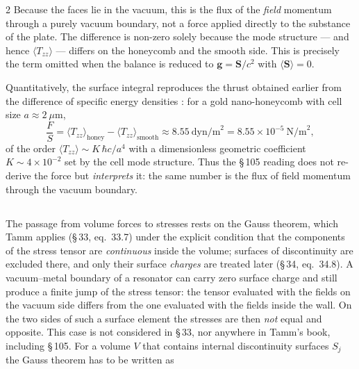 \documentclass[twoside, 10pt]{article}
\def\myvspacebeforesubsection{-2.0mm}
\def\myvspaceaftersubsection{-2.5mm}
\begin{document}
\begin{multicols}{2}
Because the faces lie in the vacuum, this is the flux of the \emph{field}
momentum through a purely vacuum boundary, not a force applied directly to the
substance of the plate. The difference is non-zero solely because the mode
structure --- and hence $\langle T_{zz}\rangle$ --- differs on the honeycomb and
the smooth side. This is precisely the term omitted when the balance is reduced
to $\mathbf{g}=\mathbf{S}/c^2$ with $\langle\mathbf{S}\rangle=0$.

Quantitatively, the surface integral reproduces the thrust obtained earlier from
the difference of specific energy densities \cite{Drozdov2024}: for a gold
nano-honeycomb with cell size $a\approx 2~\mu$m,
\[
\frac{F}{S} = \langle T_{zz}\rangle_{\mathrm{honey}} - \langle T_{zz}\rangle_{\mathrm{smooth}}
\approx 8.55~\text{dyn/m}^2 = 8.55\times10^{-5}~\text{N/m}^2 ,
\]
of the order $\langle T_{zz}\rangle \sim K\,\hbar c/a^4$ with a dimensionless
geometric coefficient $K\sim 4\times10^{-2}$ set by the cell mode structure.
Thus the \S\,105 reading does not re-derive the force but \emph{interprets} it:
the same number is the flux of field momentum through the vacuum boundary.


\vspace{\myvspacebeforesubsection}
\subsection*{}
\vspace{\myvspaceaftersubsection}


The passage from volume forces to stresses rests on the Gauss theorem, which
Tamm applies (\S\,33, eq.~33.7) under the explicit condition that the
components of the stress tensor are \emph{continuous} inside the volume; surfaces
of discontinuity are excluded there, and only their surface \emph{charges} are
treated later (\S\,34, eq.~34.8). A vacuum--metal boundary of a resonator can carry
zero surface charge and still produce a finite jump of the stress tensor: the tensor
evaluated with the fields on the vacuum side differs from the one evaluated with the
fields inside the wall. On the two sides of such a surface element the stresses are
then \emph{not} equal and opposite. This case is not considered in \S\,33, nor
anywhere in Tamm's book, including \S\,105. For a volume $V$ that contains internal
discontinuity surfaces $S_j$ the Gauss theorem has to be written as
\end{multicols}
\end{document}
